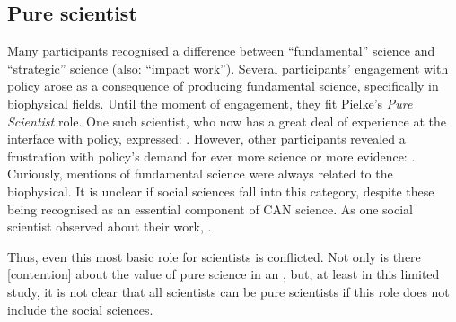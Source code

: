 \subsection{Pure scientist}
Many participants recognised a difference between ``fundamental'' science and ``strategic'' science (also: ``impact work''). Several participants' engagement with policy arose as a consequence of producing fundamental science, specifically in biophysical fields. Until the moment of engagement, they fit Pielke's \emph{Pure Scientist} role.  One such scientist, who now has a great deal of experience at the interface with policy, expressed: . However, other participants revealed a frustration with policy's demand for ever more science or more evidence: .
Curiously, mentions of fundamental science were always related to the biophysical. It is unclear if social sciences fall into this category, despite these being recognised as an essential component of CAN science. As one social scientist observed about their work, .

Thus, even this most basic role for scientists is conflicted. Not only is there [contention] about the value of pure science in an , but, at least in this limited study, it is not clear that all scientists can be pure scientists if this role does not include the social sciences. %


